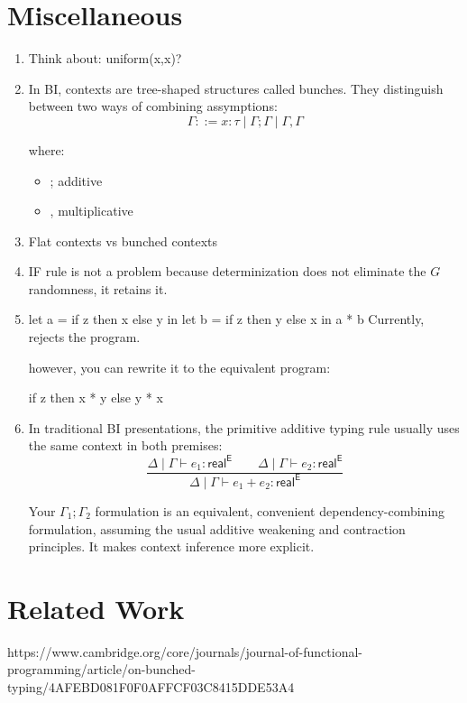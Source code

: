 \documentclass[manuscript,review,nonacm]{acmart}
\newcommand{\E}{\mathsf{E}}
\newcommand{\real}[1]{\mathsf{real}^{#1}}
\begin{document}
\section{Miscellaneous}
\begin{enumerate}
  \item Think about: uniform(x,x)?
  \item In BI, contexts are tree-shaped structures called bunches. They distinguish between two ways of combining assymptions:
  \[
    \Gamma ::= x:\tau
    \mid \Gamma;\Gamma
    \mid \Gamma,\Gamma
  \]

  where:
  \begin{itemize}
    \item ; additive
    \item , multiplicative
  \end{itemize}

  \item Flat contexts vs bunched contexts 
  \item \textsc{IF} rule is not a problem because determinization does not eliminate the $G$ randomness, it retains it.
  
  \item let a = if z then x else y in
let b = if z then y else x in
a * b Currently, rejects the program.

however, you can rewrite it to the equivalent program:

if z then
  x * y
else
  y * x

\item In traditional BI presentations, the primitive additive typing rule usually uses the same context in both premises:
\[
\frac{
\Delta\mid\Gamma\vdash e_1:\real{\E}
\qquad
\Delta\mid\Gamma\vdash e_2:\real{\E}
}{
\Delta\mid\Gamma\vdash e_1+e_2:\real{\E}
}
\]

Your \(\Gamma_1;\Gamma_2\) formulation is an equivalent, convenient dependency-combining formulation, assuming the usual additive weakening and contraction principles. It makes context inference more explicit.
\end{enumerate}

\section{Related Work}
https://www.cambridge.org/core/journals/journal-of-functional-programming/article/on-bunched-typing/4AFEBD081F0F0AFFCF03C8415DDE53A4
\end{document}
